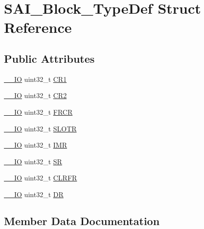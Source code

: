 \hypertarget{struct_s_a_i___block___type_def}{}\section{S\+A\+I\+\_\+\+Block\+\_\+\+Type\+Def Struct Reference}
\label{struct_s_a_i___block___type_def}
\subsection*{Public Attributes}
\begin{DoxyCompactItemize}
\item 
\hyperlink{core__sc300_8h_aec43007d9998a0a0e01faede4133d6be}{\+\_\+\+\_\+\+IO} uint32\+\_\+t \hyperlink{struct_s_a_i___block___type_def_a8935f3f22c733c1cb5a05cecf3cfa38c}{C\+R1}
\item 
\hyperlink{core__sc300_8h_aec43007d9998a0a0e01faede4133d6be}{\+\_\+\+\_\+\+IO} uint32\+\_\+t \hyperlink{struct_s_a_i___block___type_def_ad9976416e6199c8c1f7bcdabe20e4bd2}{C\+R2}
\item 
\hyperlink{core__sc300_8h_aec43007d9998a0a0e01faede4133d6be}{\+\_\+\+\_\+\+IO} uint32\+\_\+t \hyperlink{struct_s_a_i___block___type_def_a56001d4b130f392c99dde9a06379af96}{F\+R\+CR}
\item 
\hyperlink{core__sc300_8h_aec43007d9998a0a0e01faede4133d6be}{\+\_\+\+\_\+\+IO} uint32\+\_\+t \hyperlink{struct_s_a_i___block___type_def_aaef957d89b76c3fa2c09ff61ee0db11d}{S\+L\+O\+TR}
\item 
\hyperlink{core__sc300_8h_aec43007d9998a0a0e01faede4133d6be}{\+\_\+\+\_\+\+IO} uint32\+\_\+t \hyperlink{struct_s_a_i___block___type_def_aefcc864961c2bb0465e2ced3bd8b4a14}{I\+MR}
\item 
\hyperlink{core__sc300_8h_aec43007d9998a0a0e01faede4133d6be}{\+\_\+\+\_\+\+IO} uint32\+\_\+t \hyperlink{struct_s_a_i___block___type_def_ad1505a32bdca9a2f8da708c7372cdafc}{SR}
\item 
\hyperlink{core__sc300_8h_aec43007d9998a0a0e01faede4133d6be}{\+\_\+\+\_\+\+IO} uint32\+\_\+t \hyperlink{struct_s_a_i___block___type_def_a52dffdfbe572129cc142023f3daeeffe}{C\+L\+R\+FR}
\item 
\hyperlink{core__sc300_8h_aec43007d9998a0a0e01faede4133d6be}{\+\_\+\+\_\+\+IO} uint32\+\_\+t \hyperlink{struct_s_a_i___block___type_def_a9217ce4fb1e7e16dc0ead8523a6c045a}{DR}
\end{DoxyCompactItemize}


\subsection{Member Data Documentation}
